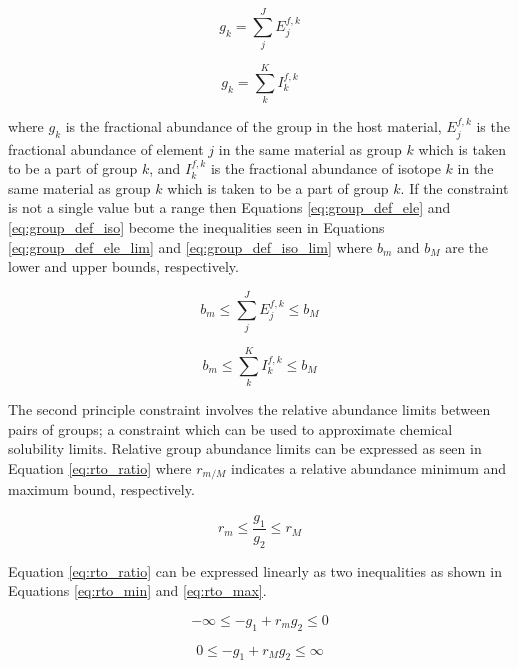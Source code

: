 \begin{equation}
\label{eq:group_def_ele}
g_{k} = \sum \limits_{j}^{J} E_{j}^{f,k}
\end{equation} 

\begin{equation}
\label{eq:group_def_iso}
g_{k} = \sum \limits_{k}^{K} I_{k}^{f,k}
\end{equation}

where $g_{k}$ is the fractional abundance of the 
group in the host material, $E_{j}^{f,k}$ is the fractional abundance of element
$j$ in the same material as group $k$ which is taken to be a part of group $k$,
and $I_{k}^{f,k}$ is the fractional 
abundance of isotope $k$ in the same material as group $k$ which is taken to 
be a part of group $k$.
If the constraint is not a single value but a range then 
Equations \ref{eq:group_def_ele} and \ref{eq:group_def_iso} become the 
inequalities seen
in Equations \ref{eq:group_def_ele_lim} and \ref{eq:group_def_iso_lim} where
$b_{m}$ and $b_{M}$ are the lower and upper bounds, respectively.

\begin{equation}
\label{eq:group_def_ele_lim}
b_m \leq \sum \limits_{j}^{J} E_{j}^{f,k} \leq b_{M}
\end{equation} 

\begin{equation}
\label{eq:group_def_iso_lim}
b_{m} \leq \sum \limits_{k}^{K} I_{k}^{f,k} \leq b_{M} 
\end{equation}

The second principle constraint involves the relative abundance limits between 
pairs of groups; a constraint which can be used to approximate chemical 
solubility limits. Relative group abundance limits can be expressed as seen in 
Equation \ref{eq:rto_ratio} where $r_{m/M}$ indicates a relative abundance 
minimum and maximum bound, respectively.

\begin{equation}
\label{eq:rto_ratio}
r_{m} \leq \frac{g_{1}}{g_{2}} \leq r_{M} 
\end{equation}

Equation \ref{eq:rto_ratio} can be expressed linearly as two inequalities as
shown in Equations \ref{eq:rto_min} and \ref{eq:rto_max}.

\begin{equation}
\label{eq:rto_min}
-\infty \leq -g_{1} + r_{m}g_{2} \leq 0
\end{equation}

\begin{equation}
\label{eq:rto_max}
0 \leq -g_{1} + r_{M}g_{2} \leq \infty
\end{equation}

